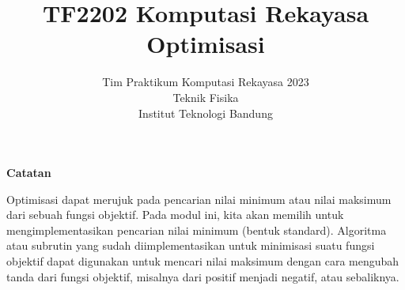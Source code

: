 



\title{%
{\small TF2202 Komputasi Rekayasa}\\
Optimisasi
}
\author{Tim Praktikum Komputasi Rekayasa 2023\\
Teknik Fisika\\
Institut Teknologi Bandung}
\date{}
\maketitle

\textbf{Catatan}

Optimisasi dapat merujuk pada pencarian nilai minimum atau nilai maksimum
dari sebuah fungsi objektif.
Pada modul ini, kita akan memilih untuk mengimplementasikan
pencarian nilai minimum (bentuk standard).
Algoritma atau subrutin yang sudah diimplementasikan
untuk minimisasi suatu fungsi objektif dapat digunakan untuk mencari nilai maksimum
dengan cara mengubah tanda dari fungsi objektif, misalnya dari positif menjadi negatif,
atau sebaliknya.


%





